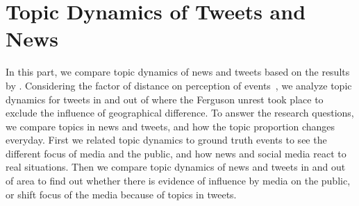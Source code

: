 \section{Topic Dynamics of Tweets and News}
\label{sec:top}

In this part, we compare topic dynamics of news and tweets based on the results by \stlda. Considering the factor of distance on perception of events~\cite{he2015uncovering}, we analyze topic dynamics for tweets in and out of \stlouis where the Ferguson unrest took place to exclude the influence of geographical difference. To answer the research questions, we compare topics in news and tweets, and how the topic proportion changes everyday. First we related topic dynamics to ground truth events to see the different focus of media and the public, and how news and social media react to real situations. Then we compare topic dynamics of news and tweets in and out of \stlouis area to find out whether there is evidence of influence by media on the public, or shift focus of the media because of topics in tweets.

